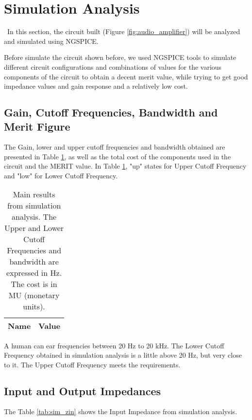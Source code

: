 \newpage
{}
\section{Simulation Analysis}
\label{sec:simulation}

~In this section, the circuit built (Figure \ref{fig:audio_amplifier}) will be analyzed and simulated using NGSPICE. 

Before simulate the circuit shown before, we used NGSPICE tools to simulate different circuit configurations and combinations of values for the various components of the circuit to obtain a decent merit value, while trying to get good impedance values and gain response and a relatively low cost. \par



\subsection{Gain, Cutoff Frequencies, Bandwidth and Merit Figure}

The Gain, lower and upper cutoff frequencies and bandwidth obtained are presented in Table \ref{tab:sim_results}, as well as the total cost of the components used in the circuit and the MERIT value. In Table \ref{tab:sim_results}, "up" states for Upper Cutoff Frequency and "low" for Lower Cutoff Frequency.

\begin{table}[H]
	\centering
	\begin{tabular}{|l|r|}
		\hline    
		{\bf Name} & {\bf Value} \\ \hline
		
	\end{tabular}
	\caption{Main results from simulation analysis. The Upper and Lower Cutoff Frequencies and bandwidth are expressed in Hz. The cost is in MU (monetary units).}
	\label{tab:sim_results}
\end{table}

A human can ear frequencies between 20 Hz to 20 kHz. The Lower Cutoff Frequency obtained in simulation analysis is a little above 20 Hz, but very close to it. The Upper Cutoff Frequency meets the requirements.

\subsection{Input and Output Impedances}

The Table \ref{tab:sim_zin} shows the Input Impedance from simulation analysis.

